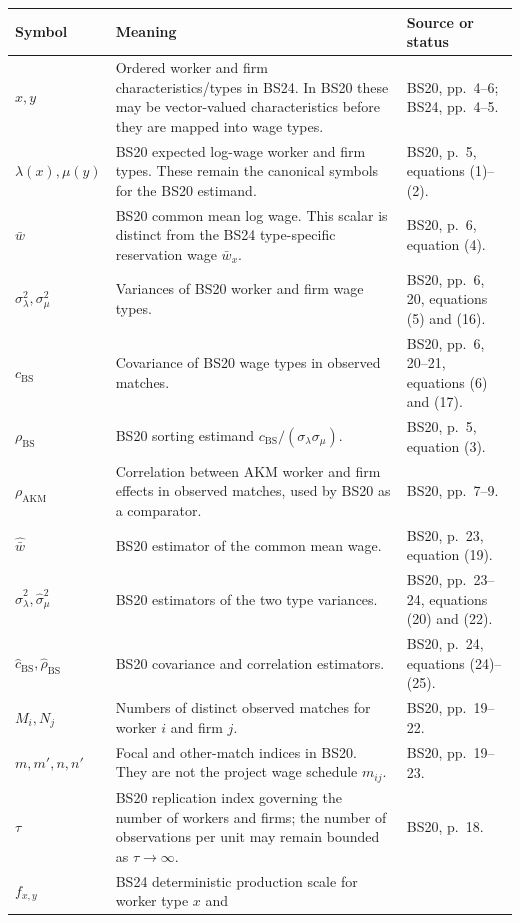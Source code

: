 \documentclass[11pt]{article}
\begin{document}
\begin{longtable}{p{}p{}p{}}
\textbf{Symbol} & \textbf{Meaning} & \textbf{Source or status} \\
\hline
\(x,y\) & Ordered worker and firm characteristics/types in BS24.  In BS20
these may be vector-valued characteristics before they are mapped into wage
types. & BS20, pp.\ 4--6; BS24, pp.\ 4--5. \\
\(\lambda(x),\mu(y)\) & BS20 expected log-wage worker and firm types.  These
remain the canonical symbols for the BS20 estimand. & BS20, p.\ 5,
equations (1)--(2). \\
\(\bar w\) & BS20 common mean log wage.  This scalar is distinct from the
BS24 type-specific reservation wage \(\bar w_x\). & BS20, p.\ 6,
equation (4). \\
\(\sigma_\lambda^2,\sigma_\mu^2\) & Variances of BS20 worker and firm wage
types. & BS20, pp.\ 6, 20, equations (5) and (16). \\
\(c_{\mathrm{BS}}\) & Covariance of BS20 wage types in observed matches. &
BS20, pp.\ 6, 20--21, equations (6) and (17). \\
\(\rho_{\mathrm{BS}}\) & BS20 sorting estimand
\(c_{\mathrm{BS}}/(\sigma_\lambda\sigma_\mu)\). & BS20, p.\ 5,
equation (3). \\
\(\rho_{\mathrm{AKM}}\) & Correlation between AKM worker and firm effects in
observed matches, used by BS20 as a comparator. & BS20, pp.\ 7--9. \\
\(\widehat{\bar w}\) & BS20 estimator of the common mean wage. & BS20,
p.\ 23, equation (19). \\
\(\widehat\sigma_\lambda^2,\widehat\sigma_\mu^2\) & BS20 estimators of the
two type variances. & BS20, pp.\ 23--24, equations (20) and (22). \\
\(\widehat c_{\mathrm{BS}},\widehat\rho_{\mathrm{BS}}\) & BS20 covariance and
correlation estimators. & BS20, p.\ 24, equations (24)--(25). \\
\(M_i,N_j\) & Numbers of distinct observed matches for worker \(i\) and firm
\(j\). & BS20, pp.\ 19--22. \\
\(m,m',n,n'\) & Focal and other-match indices in BS20.  They are not the
project wage schedule \(m_{ij}\). & BS20, pp.\ 19--23. \\
\(\tau\) & BS20 replication index governing the number of workers and firms;
the number of observations per unit may remain bounded as
\(\tau\to\infty\). & BS20, p.\ 18. \\
\(f_{x,y}\) & BS24 deterministic production scale for worker type \(x\) and

\end{longtable}
\end{document}

